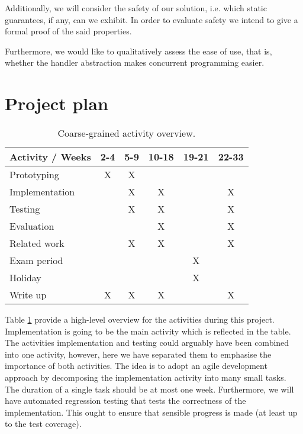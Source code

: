 \documentclass[preprint,10pt,numbers]{sigplanconf}
\begin{document}
Additionally, we will consider the safety of our solution, i.e. which static guarantees, if any, can we exhibit. In order to evaluate safety we intend to give a formal proof of the said properties.

Furthermore, we would like to qualitatively assess the ease of use, that is, whether the handler abstraction makes concurrent programming easier.

  \section{Project plan}
  \begin{table}[H]
    \centering
    \begin{tabular}{ | l | c | c | c | c | c | }
      \hline
      \multicolumn{1}{|c|}{Activity / Weeks} & 2-4 & 5-9 & 10-18 & 19-21 & 22-33 \\
      \hline
      Prototyping    & X & X & & & \\
      \hline
      Implementation &  & X & X &  & X \\
      \hline
      Testing        &  & X & X &  & X \\
      \hline
      Evaluation     &   &   & X &  & X \\
      \hline
      Related work   &   & X & X &   & X \\
      \hline
      Exam period    &   &   &   & X &   \\
      \hline
      Holiday        &   &   &   & X &   \\
      \hline
      Write up       & X & X & X &   & X  \\
      \hline
    \end{tabular}\caption{Coarse-grained activity overview.}\label{tbl:activities}
  \end{table}
Table \ref{tbl:activities} provide a high-level overview for the activities during this project. Implementation is going to be the main activity which is reflected in the table. The activities implementation and testing could arguably have been combined into one activity, however, here we have separated them to emphasise the importance of both activities. The idea is to adopt an agile development approach by decomposing the implementation activity into many small tasks. The duration of a single task should be at most one week. Furthermore, we will have automated regression testing that tests the correctness of the implementation. This ought to ensure that sensible progress is made (at least up to the test coverage).
\end{document}
